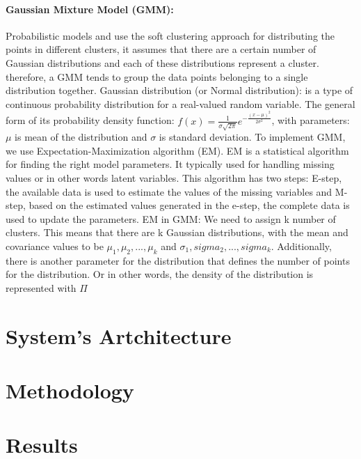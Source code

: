 \documentclass[a4paper,12pt]{report}
\begin{document}
    \subsubsection{Gaussian Mixture Model (GMM): }
    Probabilistic models and use the soft clustering approach for distributing the points in different clusters, it assumes that there are a certain number of Gaussian distributions and each of these distributions represent a cluster. therefore, a GMM tends to group the data points belonging to a single distribution together.
    \newline
    Gaussian distribution (or Normal distribution): is a type of continuous probability distribution for a real-valued random variable. The general form of its probability density function:
    $f(x) = \frac{1}{\sigma \sqrt{2\pi}}e^{-\frac{(x-\mu)^2}{2\sigma^2}}$, with parameters: $\mu$ is mean of the distribution and $\sigma$ is standard deviation.
    \newline
    To implement GMM, we use Expectation-Maximization algorithm (EM). EM is a statistical algorithm for finding the right model parameters.
    It typically used for handling missing values or in other words latent variables. This algorithm has two steps: E-step, the available data is used to estimate the values of the missing variables
    and M-step, based on the estimated values generated in the e-step, the complete data is used to update the parameters.
    \newline
    EM in GMM: We need to assign k number of clusters. This means that there are k Gaussian distributions, with the mean and covariance values to be $\mu_1, \mu_2, ..., \mu_k$
    and $\sigma_1, sigma_2, ..., sigma_k$. Additionally, there is another parameter for the distribution that defines the number of points for the distribution. Or in other words, the density of the distribution is represented with $\Pi$


    \chapter{System's Artchitecture}

    
    \chapter{Methodology}


    
    \chapter{Results}
\end{document}
